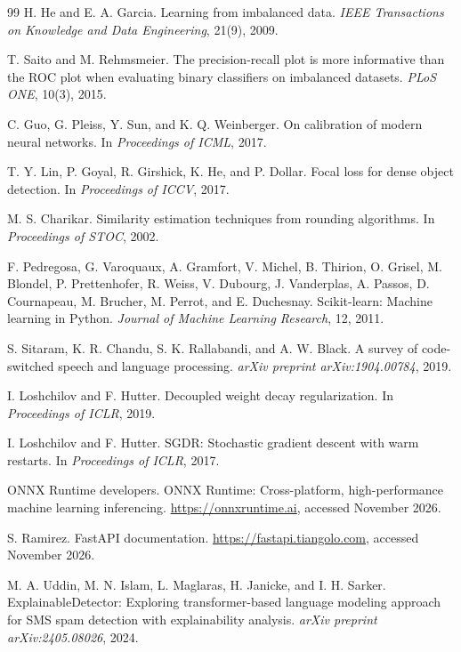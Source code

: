 \documentclass[11pt]{article}
\begin{document}
\begin{thebibliography}{99}
H. He and E. A. Garcia.
Learning from imbalanced data.
\textit{IEEE Transactions on Knowledge and Data Engineering}, 21(9), 2009.

T. Saito and M. Rehmsmeier.
The precision-recall plot is more informative than the ROC plot when evaluating binary classifiers on imbalanced datasets.
\textit{PLoS ONE}, 10(3), 2015.

C. Guo, G. Pleiss, Y. Sun, and K. Q. Weinberger.
On calibration of modern neural networks.
In \textit{Proceedings of ICML}, 2017.

T. Y. Lin, P. Goyal, R. Girshick, K. He, and P. Dollar.
Focal loss for dense object detection.
In \textit{Proceedings of ICCV}, 2017.

M. S. Charikar.
Similarity estimation techniques from rounding algorithms.
In \textit{Proceedings of STOC}, 2002.

F. Pedregosa, G. Varoquaux, A. Gramfort, V. Michel, B. Thirion, O. Grisel, M. Blondel, P. Prettenhofer, R. Weiss, V. Dubourg, J. Vanderplas, A. Passos, D. Cournapeau, M. Brucher, M. Perrot, and E. Duchesnay.
Scikit-learn: Machine learning in Python.
\textit{Journal of Machine Learning Research}, 12, 2011.

S. Sitaram, K. R. Chandu, S. K. Rallabandi, and A. W. Black.
A survey of code-switched speech and language processing.
\textit{arXiv preprint arXiv:1904.00784}, 2019.

I. Loshchilov and F. Hutter.
Decoupled weight decay regularization.
In \textit{Proceedings of ICLR}, 2019.

I. Loshchilov and F. Hutter.
SGDR: Stochastic gradient descent with warm restarts.
In \textit{Proceedings of ICLR}, 2017.

ONNX Runtime developers.
ONNX Runtime: Cross-platform, high-performance machine learning inferencing.
\url{https://onnxruntime.ai}, accessed November 2026.

S. Ramirez.
FastAPI documentation.
\url{https://fastapi.tiangolo.com}, accessed November 2026.

M. A. Uddin, M. N. Islam, L. Maglaras, H. Janicke, and I. H. Sarker.
ExplainableDetector: Exploring transformer-based language modeling approach for SMS spam detection with explainability analysis.
\textit{arXiv preprint arXiv:2405.08026}, 2024.


\end{thebibliography}
\end{document}
